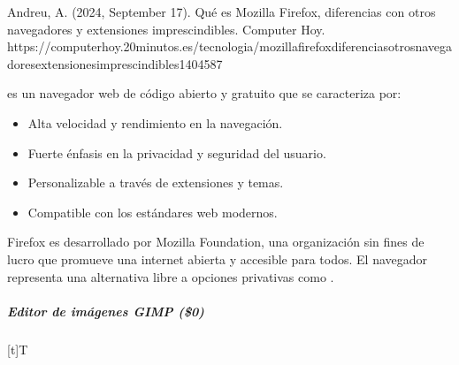 \documentclass[letterpaper,10pt,spanish]{sphinxmanual}
\let\sphinxpxdimen\pdfpxdimen\else\newdimen\sphinxpxdimen
\begin{document}
\sphinxAtStartPar
%
\begin{footnote}[4]\sphinxAtStartFootnote
Andreu, A. (2024, September 17). Qué es Mozilla Firefox, diferencias con otros navegadores y extensiones imprescindibles. Computer Hoy. https://computerhoy.20minutos.es/tecnologia/mozilla\sphinxhyphen{}firefox\sphinxhyphen{}diferencias\sphinxhyphen{}otros\sphinxhyphen{}navegadores\sphinxhyphen{}extensiones\sphinxhyphen{}imprescindibles\sphinxhyphen{}1404587
%
\end{footnote}  es un navegador web de código abierto y gratuito que se caracteriza por:
\begin{itemize}
\item {} 
\sphinxAtStartPar
Alta velocidad y rendimiento en la navegación.

\item {} 
\sphinxAtStartPar
Fuerte énfasis en la privacidad y seguridad del usuario.

\item {} 
\sphinxAtStartPar
Personalizable a través de extensiones y temas.

\item {} 
\sphinxAtStartPar
Compatible con los estándares web modernos.

\end{itemize}

\sphinxAtStartPar
Firefox es desarrollado por Mozilla Foundation, una organización sin fines de lucro que promueve una internet abierta y accesible para todos. El navegador representa una alternativa libre a opciones privativas como .


\subparagraph{Editor de imágenes GIMP (\$0)}
\label{\detokenize{cursos/ofimatica10/recursos/T02:editor-de-imagenes-gimp-0}}

\begin{savenotes}\sphinxattablestart
\sphinxthistablewithglobalstyle
\centering
\begin{tabulary}{\linewidth}[t]{T}
\sphinxtoprule
\sphinxtableatstartofbodyhook

\begin{sphinxfigure-in-table}
\centering
\capstart
\noindent\sphinxincludegraphics[width=300\sphinxpxdimen]{{image051}.png}
\label{\detokenize{cursos/ofimatica10/recursos/T02:id37}}\end{sphinxfigure-in-table}\relax
\\
\sphinxbottomrule
\end{tabulary}
\sphinxtableafterendhook\par
\sphinxattableend\end{savenotes}
\end{document}
